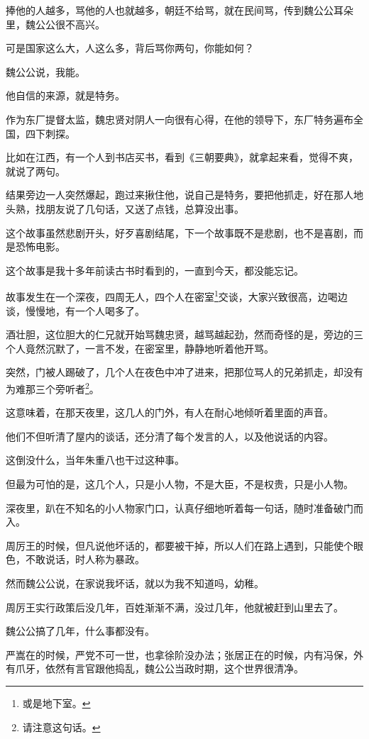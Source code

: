 \begin{multicols}{\theparacolNo}
		捧他的人越多，骂他的人也就越多，朝廷不给骂，就在民间骂，传到魏公公耳朵里，魏公公很不高兴。

		可是国家这么大，人这么多，背后骂你两句，你能如何？

		魏公公说，我能。

		他自信的来源，就是特务。

		作为东厂提督太监，魏忠贤对阴人一向很有心得，在他的领导下，东厂特务遍布全国，四下刺探。

		比如在江西，有一个人到书店买书，看到《三朝要典》，就拿起来看，觉得不爽，就说了两句。

		结果旁边一人突然爆起，跑过来揪住他，说自己是特务，要把他抓走，好在那人地头熟，找朋友说了几句话，又送了点钱，总算没出事。

		这个故事虽然悲剧开头，好歹喜剧结尾，下一个故事既不是悲剧，也不是喜剧，而是恐怖电影。

		这个故事是我十多年前读古书时看到的，一直到今天，都没能忘记。

		故事发生在一个深夜，四周无人，四个人在密室\footnote{或是地下室。}交谈，大家兴致很高，边喝边谈，慢慢地，有一个人喝多了。

		酒壮胆，这位胆大的仁兄就开始骂魏忠贤，越骂越起劲，然而奇怪的是，旁边的三个人竟然沉默了，一言不发，在密室里，静静地听着他开骂。

		突然，门被人踢破了，几个人在夜色中冲了进来，把那位骂人的兄弟抓走，却没有为难那三个旁听者\footnote{请注意这句话。}。

		这意味着，在那天夜里，这几人的门外，有人在耐心地倾听着里面的声音。

		他们不但听清了屋内的谈话，还分清了每个发言的人，以及他说话的内容。

		这倒没什么，当年朱重八也干过这种事。

		但最为可怕的是，这几个人，只是小人物，不是大臣，不是权贵，只是小人物。

		深夜里，趴在不知名的小人物家门口，认真仔细地听着每一句话，随时准备破门而入。

		周厉王的时候，但凡说他坏话的，都要被干掉，所以人们在路上遇到，只能使个眼色，不敢说话，时人称为暴政。

		然而魏公公说，在家说我坏话，就以为我不知道吗，幼稚。

		周厉王实行政策后没几年，百姓渐渐不满，没过几年，他就被赶到山里去了。

		魏公公搞了几年，什么事都没有。

		严嵩在的时候，严党不可一世，也拿徐阶没办法；张居正在的时候，内有冯保，外有爪牙，依然有言官跟他捣乱，魏公公当政时期，这个世界很清净。


\end{multicols}
